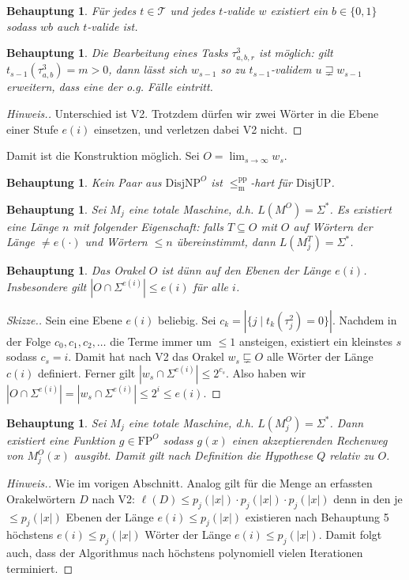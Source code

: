 \documentclass[nofonts]{uebung}
\newtheorem{claim}[theorem]{Behauptung}
\def\FP{\ensuremath{\mathrm{FP}}}
\def\DisjNP{\ensuremath{\mathrm{DisjNP}}}
\def\DisjUP{\ensuremath{\mathrm{DisjUP}}}
\def\leqmpp{\ensuremath{\leq_\mathrm{m}^\mathrm{pp}}}
\begin{document}
\begin{claim}
    Für jedes $t\in\mathcal T$ und jedes $t$-valide $w$ existiert ein $b\in\{0,1\}$ sodass $wb$ auch $t$-valide ist.
\end{claim}

\begin{claim}
    Die Bearbeitung eines Tasks $\tau^3_{a,b,r}$ ist möglich: gilt $t_{s-1}(\tau^3_{a,b})=m>0$, dann lässt sich $w_{s-1}$ so zu $t_{s-1}$-validem $u\sqsupsetneq w_{s-1}$ erweitern, dass eine der o.g. Fälle eintritt.
\end{claim}
\begin{proof}[Hinweis.]
    Unterschied ist V2. Trotzdem dürfen wir zwei Wörter in die Ebene einer Stufe $e(i)$ einsetzen, und verletzen dabei V2 nicht.
\end{proof}

Damit ist die Konstruktion möglich. Sei $O=\lim_{s\to\infty} w_s$.

\begin{claim}
    Kein Paar aus $\DisjNP^O$ ist $\leqmpp$-hart für $\DisjUP$.
\end{claim}


\begin{claim}
    Sei $M_j$ eine totale Maschine, d.h. $L(M^O)=\Sigma^*$.
    Es existiert eine Länge $n$ mit folgender Eigenschaft: 
    falls $T\subseteq O$ mit $O$ auf Wörtern der Länge $\neq e(\cdot)$ und Wörtern $\leq n$ übereinstimmt, dann $L(M_j^T)=\Sigma^*$.
\end{claim}

\begin{claim}
    Das Orakel $O$ ist dünn auf den Ebenen der Länge $e(i)$. Insbesondere gilt $|O\cap \Sigma^{e(i)}|\leq e(i)$ für alle $i$.
\end{claim}
\begin{proof}[Skizze.]
    Sein eine Ebene $e(i)$ beliebig.
    Sei $c_k=|\{j\mid t_{k}(\tau^2_j)=0 \}|$.
    Nachdem in der Folge $c_0, c_1, c_2, \dots$ die Terme immer um $\leq 1$ ansteigen, existiert ein kleinstes $s$ sodass $c_s=i$.
    Damit hat nach V2 das Orakel $w_s\sqsubsetneq O$ alle Wörter der Länge $c(i)$ definiert.
    Ferner gilt $|w_s\cap\Sigma^{e(i)}|\leq 2^{c_s}$.
    Also haben wir $|O\cap\Sigma^{e(i)}|=|w_s\cap\Sigma^{e(i)}|\leq 2^{i}\leq e(i)$.
\end{proof}

\begin{claim}
    Sei $M_j$ eine totale Maschine, d.h. $L(M_j^O)=\Sigma^*$. Dann existiert eine Funktion $g\in \FP^O$ sodass $g(x)$ einen akzeptierenden Rechenweg von $M^O_j(x)$ ausgibt. Damit gilt nach Definition die Hypothese $Q$ relativ zu $O$.
\end{claim}
\begin{proof}[Hinweis.]
    Wie im vorigen Abschnitt. Analog gilt für die Menge an erfassten Orakelwörtern $D$ nach V2: $\ell(D) \leq p_j(|x|)\cdot p_j(|x|)\cdot p_j(|x|)$ denn in den je $\leq p_j(|x|)$ Ebenen der Länge $e(i)\leq p_j(|x|)$ existieren nach Behauptung 5 höchstens $e(i)\leq p_j(|x|)$ Wörter der Länge $e(i)\leq p_j(|x|)$.
    Damit folgt auch, dass der Algorithmus nach höchstens polynomiell vielen Iterationen terminiert.
\end{proof}
\end{document}
